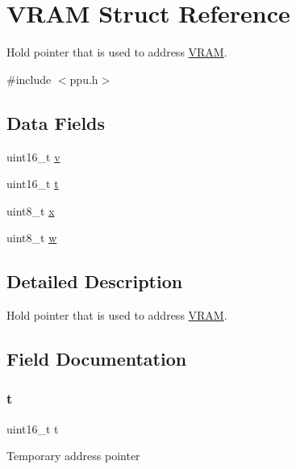 \hypertarget{struct_v_r_a_m}{}\section{V\+R\+AM Struct Reference}
\label{struct_v_r_a_m}


Hold pointer that is used to address \hyperlink{struct_v_r_a_m}{V\+R\+AM}.  




{\ttfamily \#include $<$ppu.\+h$>$}

\subsection*{Data Fields}
\begin{DoxyCompactItemize}
\item 
uint16\+\_\+t \hyperlink{struct_v_r_a_m_ac5f38113a34f9eab3e7782eade81d266}{v}
\item 
uint16\+\_\+t \hyperlink{struct_v_r_a_m_a3636f663c6b00463f1bad29dd9617997}{t}
\item 
uint8\+\_\+t \hyperlink{struct_v_r_a_m_a0f561e77fa0f040b637f4e04f6cd8078}{x}
\item 
uint8\+\_\+t \hyperlink{struct_v_r_a_m_aba9ed0487b0aa23eba534648df8384c0}{w}
\end{DoxyCompactItemize}


\subsection{Detailed Description}
Hold pointer that is used to address \hyperlink{struct_v_r_a_m}{V\+R\+AM}. 

\subsection{Field Documentation}
\mbox{\label{struct_v_r_a_m_a3636f663c6b00463f1bad29dd9617997}} 
\subsubsection{\texorpdfstring{t}{t}}
{\footnotesize\ttfamily uint16\+\_\+t t}

Temporary address pointer \mbox{\label{struct_v_r_a_m_ac5f38113a34f9eab3e7782eade81d266}} 
